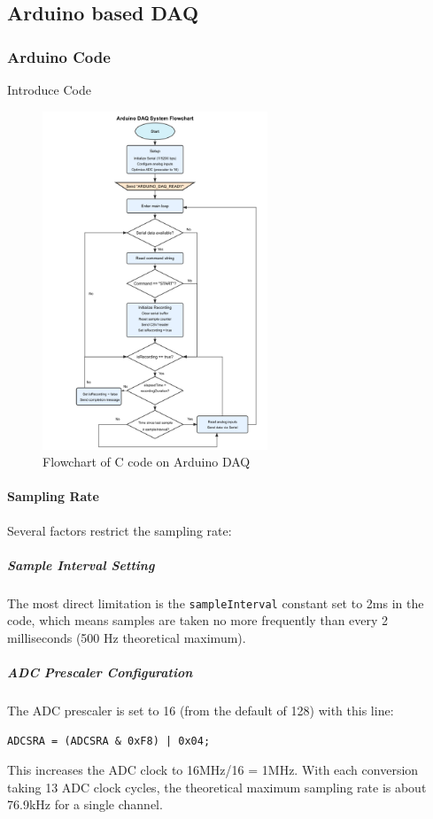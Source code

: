 \subsection{Arduino based DAQ}
\subsubsection{Arduino Code}
Introduce Code
\begin{figure}[htbp] %
  \centering
  \includegraphics[width=0.6\textwidth]{chapters/methodology/ArduinoDAQ/flowchart_Arduino_code.png} %
  \caption{Flowchart of C code on Arduino DAQ}      
  \label{fig:daq_arduino_code}           
\end{figure}                            
\paragraph{Sampling Rate}
Several factors restrict the sampling rate:

\subparagraph{Sample Interval Setting}
The most direct limitation is the \texttt{sampleInterval} constant set to 2ms in the code, which means samples are taken no more frequently than every 2 milliseconds (500 Hz theoretical maximum).

\subparagraph{ADC Prescaler Configuration}
The ADC prescaler is set to 16 (from the default of 128) with this line:
\begin{verbatim}
ADCSRA = (ADCSRA & 0xF8) | 0x04;
\end{verbatim}
This increases the ADC clock to 16MHz/16 = 1MHz. With each conversion taking 13 ADC clock cycles, the theoretical maximum sampling rate is about 76.9kHz for a single channel.

